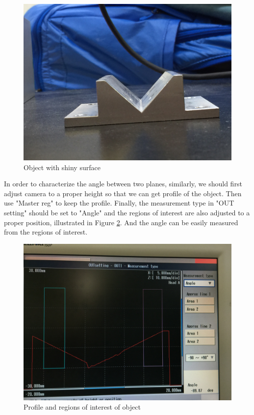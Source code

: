 \documentclass[english]{article}
\begin{document}
\begin{figure}[H]
	\centering
	\includegraphics[width=0.8\linewidth]{Lab6/Angle5.JPG}
	\caption{Object with shiny surface}
	\label{fig:three}
\end{figure}

In order to characterize the angle between two planes, similarly, we should first adjust camera to a proper height so that we can get profile of the object. Then use "Master reg" to keep the profile. Finally, the measurement type in "OUT setting" should be set to "Angle" and the regions of interest are also adjusted to a proper position, illustrated in Figure \ref{fig:four}. And the angle can be easily measured from the regions of interest.\\

\begin{figure}[H]
	\centering
	\includegraphics[width=0.8\linewidth]{Lab6/Angle1.JPG}
	\caption{Profile and regions of interest of object}
	\label{fig:four}
\end{figure}
\end{document}
